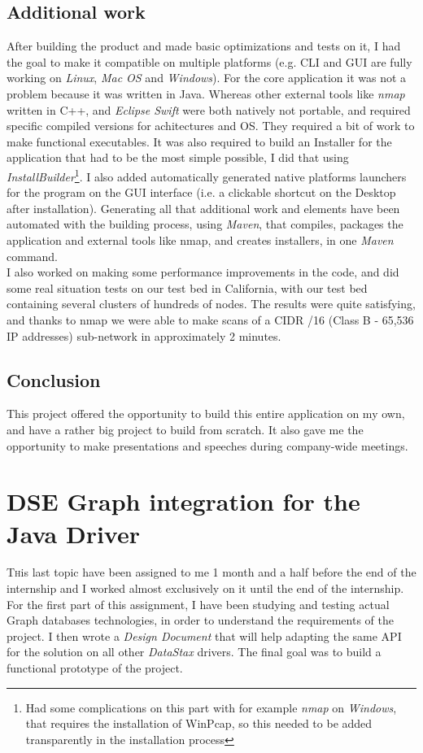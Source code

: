 \documentclass[a4paper]{report}
\newcommand{\ds}{\emph{DataStax\xspace}}
\begin{document}
\section{Additional work}
After building the product and made basic optimizations and tests on it, I had the goal to make it compatible on multiple platforms (e.g. CLI and GUI are fully working on \emph{Linux}, \emph{Mac OS} and \emph{Windows}). For the core application it was not a problem because it was written in Java. Whereas other external tools like \emph{nmap} written in C++, and \emph{Eclipse Swift} were both natively not portable, and required specific compiled versions for achitectures and OS. They required a bit of work to make functional executables. It was also required to build an Installer for the application that had to be the most simple possible, I did that using \emph{InstallBuilder}\footnote{Had some complications on this part with for example \emph{nmap} on \emph{Windows}, that requires the installation of WinPcap, so this needed to be added transparently in the installation process}. I also added automatically generated native platforms launchers for the program on the GUI interface (i.e. a clickable shortcut on the Desktop after installation). Generating all that additional work and elements have been automated with the building process, using \emph{Maven}, that compiles, packages the application and external tools like nmap, and creates installers, in one \emph{Maven} command.\\
I also worked on making some performance improvements in the code, and did some real situation tests on our test bed in California, with our test bed containing several clusters of hundreds of nodes. The results were quite satisfying, and thanks to nmap we were able to make scans of a CIDR /16 (Class B - 65,536 IP addresses) sub-network in approximately 2 minutes.

\section{Conclusion}
This project offered the opportunity to build this entire application on my own, and have a rather big project to build from scratch. It also gave me the opportunity to make presentations and speeches during company-wide meetings.




\chapter{DSE Graph integration for the Java Driver}
\lettrine[nindent=0em,lines=3]{T}his last topic have been assigned to me 1 month and a half before the end of the internship and I worked almost exclusively on it until the end of the internship.\\
For the first part of this assignment, I have been studying and testing actual Graph databases technologies, in order to understand the requirements of the project. I then wrote a \emph{Design Document} that will help adapting the same API for the solution on all other \ds{} drivers. The final goal was to build a functional prototype of the project.
\end{document}
